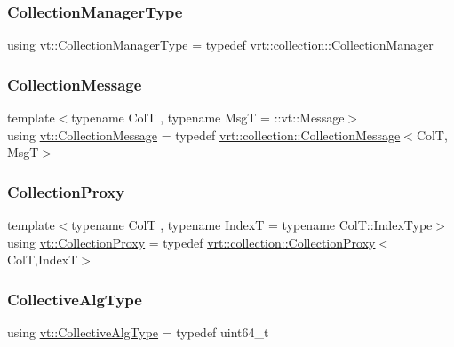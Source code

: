\subsubsection{\texorpdfstring{Collection\+Manager\+Type}{CollectionManagerType}}
{\footnotesize\ttfamily using \hyperlink{namespacevt_a290f7e8941f9f411b54cdb15b6cea107}{vt\+::\+Collection\+Manager\+Type} = typedef \hyperlink{structvt_1_1vrt_1_1collection_1_1_collection_manager}{vrt\+::collection\+::\+Collection\+Manager}}

\mbox{\label{namespacevt_ae7700e12f79c0fec16964aab84838428}} 
\subsubsection{\texorpdfstring{Collection\+Message}{CollectionMessage}}
{\footnotesize\ttfamily template$<$typename ColT , typename MsgT  = \+::vt\+::\+Message$>$ \\
using \hyperlink{namespacevt_ae7700e12f79c0fec16964aab84838428}{vt\+::\+Collection\+Message} = typedef \hyperlink{structvt_1_1vrt_1_1collection_1_1_collection_message}{vrt\+::collection\+::\+Collection\+Message}$<$ColT, MsgT$>$}

\mbox{\label{namespacevt_a0d58a693bfb96e0ce5d145692a1a1f98}} 
\subsubsection{\texorpdfstring{Collection\+Proxy}{CollectionProxy}}
{\footnotesize\ttfamily template$<$typename ColT , typename IndexT  = typename Col\+T\+::\+Index\+Type$>$ \\
using \hyperlink{namespacevt_a0d58a693bfb96e0ce5d145692a1a1f98}{vt\+::\+Collection\+Proxy} = typedef \hyperlink{structvt_1_1vrt_1_1collection_1_1_collection_proxy}{vrt\+::collection\+::\+Collection\+Proxy}$<$ColT,IndexT$>$}

\mbox{\label{namespacevt_a5ffcf8e168b77b0f36e11b616049a1cf}} 
\subsubsection{\texorpdfstring{Collective\+Alg\+Type}{CollectiveAlgType}}
{\footnotesize\ttfamily using \hyperlink{namespacevt_a5ffcf8e168b77b0f36e11b616049a1cf}{vt\+::\+Collective\+Alg\+Type} = typedef uint64\+\_\+t}



